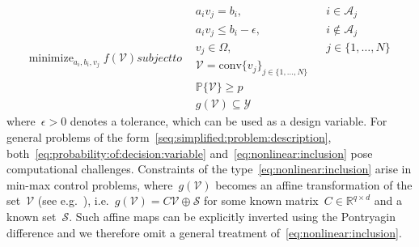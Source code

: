 \documentclass[letterpaper, 10pt, conference]{ieeeconf} %
\providecommand{\conv}{\text{conv}}
\DeclareMathOperator*{\minimize}{minimize}
\begin{document}
\begin{subequations}\label{seq:simplified:problem:description}
\begin{equation}
	\minimize_{a_i,b_i,v_j} f(\mathcal V) %
\end{equation}
%
subject to
%
\begin{alignat}{2}
        & a_i v_j=b_i, & & i\in\mathcal A_j\\
	& a_i v_j\leq b_i-\epsilon, & & i\not\in\mathcal A_j \\
%
	& v_j\in\Omega,  & & j\in\{1,\dots,N\} \\
%
	& \mathcal V = \conv\{v_j\}_{j\in\{1,\dots,N\}} \\
%
\label{eq:probability:of:decision:variable}
	& \mathbb P\{\mathcal V\}\geq p \\
%
\label{eq:nonlinear:inclusion}
	& g(\mathcal V)\subseteq\mathcal Y
\end{alignat}
\end{subequations}
%
where~$\epsilon>0$ denotes a tolerance, which can be used as a design variable.
%
For general problems of the form~\eqref{seq:simplified:problem:description}, both~\eqref{eq:probability:of:decision:variable} and~\eqref{eq:nonlinear:inclusion} pose computational challenges.
%
Constraints of the type~\eqref{eq:nonlinear:inclusion} arise in min-max control problems, where~$g(\mathcal V)$ becomes an affine transformation of the set~$\mathcal V$ (see e.g.~\cite{Schaich:2017}), i.e.~$g(\mathcal V) = C\mathcal V\oplus \mathcal S$ for some known matrix~$C\in\mathbb R^{q\times d}$ and a known set~$\mathcal S$. 
%
Such affine maps can be explicitly inverted using the Pontryagin difference and we therefore omit a general treatment of~\eqref{eq:nonlinear:inclusion}.
%
\end{document}
